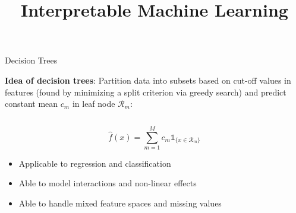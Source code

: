 \documentclass[11pt,compress,t,notes=noshow, aspectratio=169, xcolor=table]{beamer}
\title{Interpretable Machine Learning}
\date{}
\begin{document}
\newcommand{\titlefigure}{figure/tree_surface2.png}
\newcommand{\learninggoals}{
\item Decision trees
\item RuleFit
\item Decision rules}



\begin{frame}{Decision Trees }


\textbf{Idea of decision trees}: 
Partition data into subsets based on cut-off values in features (found by minimizing a split criterion via greedy search) and predict constant mean $c_m$ in leaf node $\mathcal{R}_m$:

\begin{columns}[T, totalwidth=\textwidth]

\begin{column}{0.65\textwidth}
$$
\hat f(x) = \sum_{m=1}^M c_m \mathds{1}_{\{x \in \mathcal{R}_m\}}
$$

\pause
\begin{itemize}
    \item Applicable to regression and classification
    \item Able to model interactions and non-linear effects
    \item Able to handle mixed feature spaces and missing values
\end{itemize}


\end{column}
\end{columns}
\end{frame}
\end{document}
